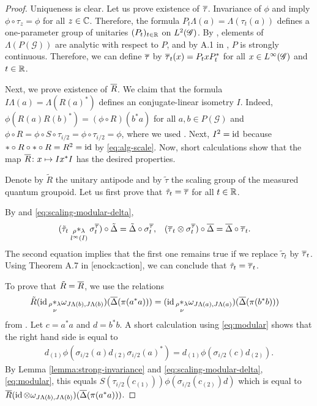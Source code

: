 \begin{proof}
  Uniqueness is clear.  Let us prove existence of $\overline{\tau}$.
  Invariance of $\phi$ and \cite[Theorem 3.49]{DCT1} imply $\phi \circ
  \tau_{z} = \phi$ for all $z\in \mathbb{C}$. Therefore, the formula
  $P_{t}\Lambda(a) = \Lambda(\tau_{t}(a))$ defines a one-parameter
  group of unitaries $(P_{t})_{t\in \mathbb{R}}$ on $L^{2}(\mathscr{G})$. By \cite[Theorem
  3.49]{DCT1}, elements of $\Lambda(P(\mathscr{G}))$ are analytic with
  respect to $P$, and by A.1 in \cite{Taksak2}, $P$ is strongly
  continuous.  Therefore, we can define $\overline{\tau}$ by  $\overline{\tau}_{t}(x)=
  P_{t}xP_{t}^{*}$ for all $x\in L^{\infty}(\mathscr{G})$ and $t\in \mathbb{R}$.
  

  Next, we prove existence of $\overline{R}$. We claim that the formula $
  I\Lambda(a) = \Lambda(R(a)^{*})$ defines an conjugate-linear
  isometry $I$. Indeed, $\phi(R(a)R(b)^{*})= (\phi\circ R)(b^{*}a)$
  for all $a,b\in P(\mathscr{G})$ and $\phi \circ R=\phi \circ S \circ
  \tau_{i/2} = \phi \circ \tau_{i/2}=\phi$, where we used \cite[Lemma
  1.30]{DCT1}. Next, $I^{2} = \operatorname{id}$ because $*\circ R \circ * \circ R=
  R^{2}=\operatorname{id}$ by \eqref{eq:alg-scale}. Now,  short calculations show
  that the map $\overline{R} \colon x \mapsto Ix^{*}I$ has the desired
  properties.


  Denote by $\tilde R$ the unitary antipode and by $\tilde\tau$ the
  scaling group of the measured quantum groupoid.  Let us first prove
  that $\tilde \tau_{t}=\overline{\tau}$ for all $t\in \mathbb{R}$.

By
  \cite{} and \eqref{eq:scaling-modular-delta},
  \begin{align*}
    (\tilde \tau_{t} \underset{l^{\infty}(I)}{_{\rho}\ast_{\lambda}} \sigma^{\overline{\tau}}_{t}) \circ \tilde \Delta
    &=\tilde \Delta \circ \sigma^{\overline{\tau}}_{t}, & (\overline{\tau}_{t} \otimes
    \sigma^{\overline{\tau}}_{t}) \circ \overline{\Delta} &= \overline{\Delta} \circ \overline{\tau}_{t}.
  \end{align*}
  The second equation implies that the first one remains true if we
  replace $\tilde\tau_{t}$ by $\overline{\tau}_{t}$.  Using Theorem A.7 in
  \cite{} [enock:action], we can conclude that $\tilde
  \tau_{t}=\overline{\tau}_{t}$.

 To prove that $\tilde R=\overline{R}$, we use the relations
  \begin{align*}
    \tilde R(\operatorname{id} \underset{\nu}{_{\rho} \ast_{\lambda}}
    \omega_{J\Lambda(b),J\Lambda(b)})(\overline{\Delta}(\pi(a^{*}a))) &= (\operatorname{id}
    \underset{\nu}{_{\rho} \ast_{\lambda}}
    \omega_{J\Lambda(a),J\Lambda(a)})(\overline{\Delta}(\pi(b^{*}b)))
  \end{align*}
from \cite{}.  
Let $c=a^{*}a$ and $d=b^{*}b$. 
A short calculation using \eqref{eq:modular} shows that  the right hand side is equal to
  \begin{align*}
    d_{(1)}\phi(\sigma_{i/2}(a)d_{(2)}\sigma_{i/2}(a)^{*})
    = d_{(1)}\phi(\sigma_{i/2}(c)d_{(2)}).
  \end{align*}
By Lemma \ref{lemma:strong-invariance} and
  \eqref{eq:scaling-modular-delta}, \eqref{eq:modular},  this equals 
  $S(\tau_{i/2}(c_{(1)}))
    \phi(\sigma_{i/2}(c_{(2)})d)$
which is equal to
$\overline{R}(\operatorname{id} \otimes
  \omega_{J\Lambda(b),J\Lambda(b)})(\overline{\Delta}(\pi(a^{*}a)))$.
\end{proof}

